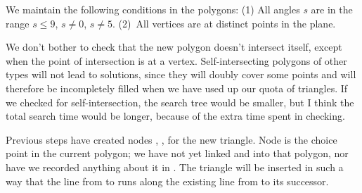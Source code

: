 We maintain the following conditions in the polygons: (1)
All angles
$s$ are in the range $s\le 9$, $s\ne0$, $s\ne5$. (2)~All vertices are at
distinct points in the plane.

We don't bother to check that the new polygon doesn't intersect itself,
except when the point of intersection is at a vertex. Self-intersecting
polygons of other types  will not lead to solutions,
since they will doubly cover some
points and will therefore be incompletely filled when we have used up
our quota of triangles. If we checked for self-intersection, the search
tree would be smaller, but I think the total search time would be
longer, because of the extra time spent in checking.

Previous steps have created nodes , ,  for the
new
triangle. Node  is the choice point in the current polygon; we have
not
yet linked  and  into that polygon, nor have we recorded
anything about it in . The triangle will be inserted in
such
a way that the line from  to  runs along the existing
line
from  to its successor.


